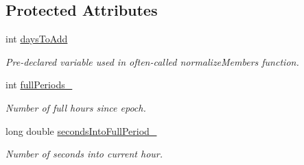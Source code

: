 \subsection*{Protected Attributes}
\begin{DoxyCompactItemize}
\item 
int \hyperlink{classtudat_1_1Time_af615aaf0193f8f4a2b1074c53ca2585c}{days\+To\+Add}\hypertarget{classtudat_1_1Time_af615aaf0193f8f4a2b1074c53ca2585c}{}\label{classtudat_1_1Time_af615aaf0193f8f4a2b1074c53ca2585c}

\begin{DoxyCompactList}\small\item\em Pre-\/declared variable used in often-\/called normalize\+Members function. \end{DoxyCompactList}\item 
int \hyperlink{classtudat_1_1Time_ad7a0e18f0575f228009af6c8f6563c49}{full\+Periods\+\_\+}\hypertarget{classtudat_1_1Time_ad7a0e18f0575f228009af6c8f6563c49}{}\label{classtudat_1_1Time_ad7a0e18f0575f228009af6c8f6563c49}

\begin{DoxyCompactList}\small\item\em Number of full hours since epoch. \end{DoxyCompactList}\item 
long double \hyperlink{classtudat_1_1Time_a8187f3e83a486eefa45a37f29c186a24}{seconds\+Into\+Full\+Period\+\_\+}\hypertarget{classtudat_1_1Time_a8187f3e83a486eefa45a37f29c186a24}{}\label{classtudat_1_1Time_a8187f3e83a486eefa45a37f29c186a24}

\begin{DoxyCompactList}\small\item\em Number of seconds into current hour. \end{DoxyCompactList}\end{DoxyCompactItemize}
